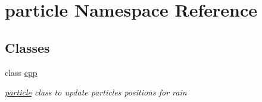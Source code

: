 \hypertarget{namespaceparticle}{
\section{particle Namespace Reference}
\label{namespaceparticle}
}
\subsection*{Classes}
\begin{DoxyCompactItemize}
\item 
class \hyperlink{classparticle_1_1cpp}{cpp}
\begin{DoxyCompactList}\small\item\em \hyperlink{namespaceparticle}{particle} class to update particles positions for rain \item\end{DoxyCompactList}\end{DoxyCompactItemize}

